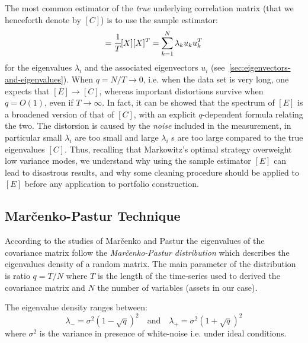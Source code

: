 The most common estimator of the \emph{true} underlying correlation matrix (that we henceforth denote by $[C]$) is to use the sample estimator:
\begin{equation}
[E] = \cfrac{1}{T}[X][X]^{T} = \sum_{k=1}^{N} \lambda_k u_k u_k^{T}
\end{equation}
for the eigenvalues $\lambda_i$ and the associated eigenvectors $u_i$ (see~\ref{sec:eigenvectors-and-eigenvalues}). When $q=N/T\rightarrow 0$, i.e. when the data set is very long, one expects that $[E]\rightarrow [C]$, whereas important distortions survive when $q=O(1)$, even if $T\rightarrow \infty$. In fact, it can be showed that the spectrum of $[E]$ is a broadened version of that of $[C]$, with an explicit $q$-dependent formula relating the two. The distorsion is caused by the \emph{noise} included in the measurement, in particular small $\lambda_i$ are too small and large $\lambda_i$ s are too large compared to the true eigenvalues $[C]$. Thus, recalling that Markowitz’s optimal strategy overweight low variance modes, we understand why using the sample estimator $[E]$ can lead to disastrous results, and why some cleaning procedure should be applied to $[E]$ before any application to portfolio construction. 

\subsection{Mar\v{c}enko-Pastur Technique}
According to the studies of Mar\v{c}enko and Pastur the eigenvalues of the covariance matrix follow the \emph{Mar\v{c}enko-Pastur distribution} which describes the eigenvalues density of a random matrix. The main parameter of the distribution is ratio $q=T/N$ where $T$ is the length of the time-series used to derived the covariance matrix and $N$ the number of variables (assets in our case).

The eigenvalue density ranges between:
\begin{equation}
\lambda_{-} = \sigma^2 \left( 1 - \sqrt{q} \right)^2 \quad \text{and} \quad \lambda_{+} = \sigma^2 \left( 1 + \sqrt{q} \right)^2
\label{eq:marcenko-pastur-distro}
\end{equation}
where $\sigma^2$ is the variance in presence of white-noise i.e. under ideal conditions.


